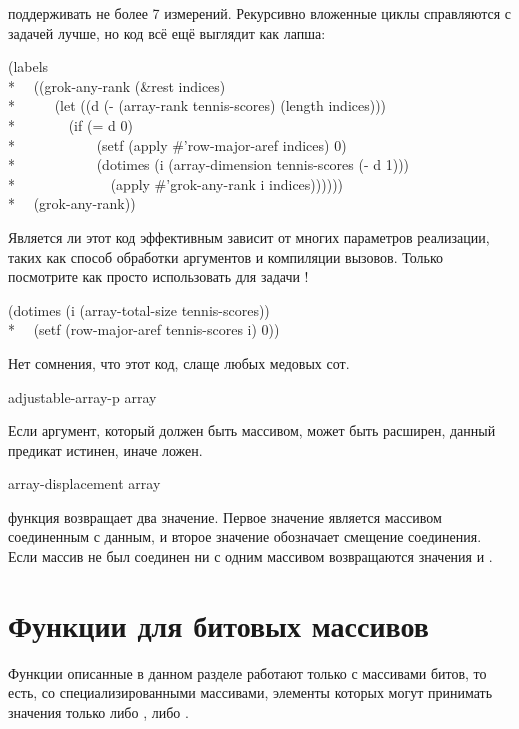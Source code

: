 \begin{defun}[Функция]
поддерживать не более 7 измерений. Рекурсивно вложенные циклы справляются с
задачей лучше, но код всё ещё выглядит как лапша:
\begin{lisp}
(labels \\*
~~((grok-any-rank (\&rest indices) \\*
~~~~~(let ((d (- (array-rank tennis-scores) (length indices))) \\*
~~~~~~~(if (= d 0) \\*
~~~~~~~~~~~(setf (apply \#'row-major-aref indices) 0) \\*
~~~~~~~~~~~(dotimes (i (array-dimension tennis-scores (- d 1))) \\*
~~~~~~~~~~~~~(apply \#'grok-any-rank i indices)))))) \\*
~~(grok-any-rank))
\end{lisp}
Является ли этот код эффективным зависит от многих параметров реализации, таких
как способ обработки  аргументов и компиляции  вызовов.
Только посмотрите как просто использовать для задачи !
\begin{lisp}
(dotimes (i (array-total-size tennis-scores)) \\*
~~(setf (row-major-aref tennis-scores i) 0))
\end{lisp}
Нет сомнения, что этот код, слаще любых медовых сот.
\end{defun}

\begin{defun}[Функция]
adjustable-array-p array

Если аргумент, который должен быть массивом, может быть расширен, данный
предикат истинен, иначе ложен.
\end{defun}

\begin{defun}[Функция]
array-displacement array

функция возвращает два значение. Первое значение является массивом соединенным с
данным, и второе значение обозначает смещение соединения. Если массив не был
соединен ни с одним массивом возвращаются значения {\nil} и .
\end{defun}

\section{Функции для битовых массивов}

Функции описанные в данном разделе работают только с массивами битов, то есть,
со специализированными массивами, элементы которых могут принимать значения
только либо , либо .

